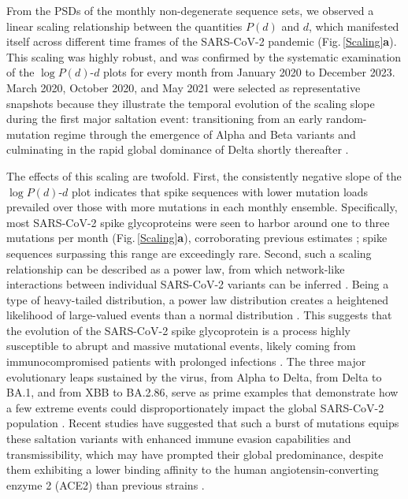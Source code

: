 \documentclass[%
 reprint,
superscriptaddress,
 amsmath,amssymb,
 aps,
]{revtex4-2}
\begin{document}
From the PSDs of the monthly non-degenerate sequence sets, we observed a linear scaling relationship between the quantities $P(\bm{\mathit{d}})$ and $\bm{\mathit{d}}$, which manifested itself across different time frames of the SARS-CoV-2 pandemic (Fig.\,\ref{Scaling}\textbf{a}). This scaling was highly robust, and was confirmed by the systematic examination of the $\log{P(\bm{\mathit{d}})}$-$\bm{\mathit{d}}$ plots for every month from January 2020 to December 2023. March 2020, October 2020, and May 2021 were selected as representative snapshots because they illustrate the temporal evolution of the scaling slope during the first major saltation event: transitioning from an early random-mutation regime through the emergence of Alpha and Beta variants and culminating in the rapid global dominance of Delta shortly thereafter \cite{10.1371/journal.pcbi.1010896}.

The effects of this scaling are twofold. First, the consistently negative slope of the $\log{P(\bm{\mathit{d}})}$-$\bm{\mathit{d}}$ plot indicates that spike sequences with lower mutation loads prevailed over those with more mutations in each monthly ensemble. Specifically, most SARS-CoV-2 spike glycoproteins were seen to harbor around one to three mutations per month (Fig.\,\ref{Scaling}\textbf{a}), corroborating previous estimates \cite{Sender2021PNAS}; spike sequences surpassing this range are exceedingly rare. Second, such a scaling relationship can be described as a power law, from which network-like interactions between individual SARS-CoV-2 variants can be inferred \cite{SOLE1999156, Brown2002}. Being a type of heavy-tailed distribution, a power law distribution creates a heightened likelihood of large-valued events than a normal distribution \cite{HALLEY199633, Newman01092005, Yule1925}. This suggests that the evolution of the SARS-CoV-2 spike glycoprotein is a process highly susceptible to abrupt and massive mutational events, likely coming from immunocompromised patients with prolonged infections \cite{10.1056/NEJMsb2104756}. The three major evolutionary leaps sustained by the virus, from Alpha to Delta, from Delta to BA.1, and from XBB to BA.2.86, serve as prime examples that demonstrate how a few extreme events could disproportionately impact the global SARS-CoV-2 population \cite{Viana2022, 10.1371/journal.pcbi.1010896, Planas2024}. Recent studies have suggested that such a burst of mutations equips these saltation variants with enhanced immune evasion capabilities and transmissibility, which may have prompted their global predominance, despite them exhibiting a lower binding affinity to the human angiotensin-converting enzyme 2 (ACE2) than previous strains \cite{WANG202481, Planas2024}.
\end{document}
